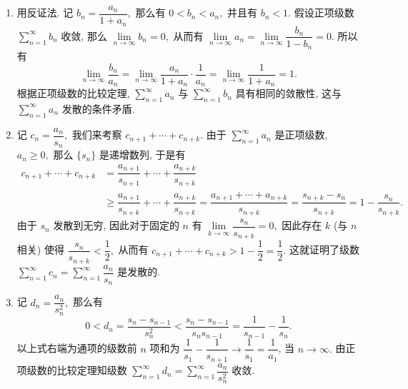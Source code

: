 \begin{solution}
  \begin{enumerate}
    \item 用反证法. 记 $b_n = \dfrac{a_n}{1 + a_n},$ 那么有 $0 < b_n < a_n,$ 并且有 $b_n < 1.$ 假设正项级数 $\sum\limits_{n=1}^{\infty} b_n$ 收敛, 那么 $\lim\limits_{n \to \infty} b_n = 0,$ 从而有 $\lim\limits_{n \to \infty} a_n = \lim\limits_{n \to \infty} \dfrac{b_n}{1 - b_n} = 0.$ 所以有
    $$\lim\limits_{n \to \infty} \dfrac{b_n}{a_n} = \lim\limits_{n \to \infty} \dfrac{a_n}{1 + a_n} \cdot \dfrac{1}{a_n} = \lim\limits_{n \to \infty} \dfrac{1}{1 + a_n} = 1.$$
    根据正项级数的比较定理, $\sum\limits_{n=1}^{\infty} a_n$ 与 $\sum\limits_{n=1}^{\infty} b_n$ 具有相同的敛散性, 这与 $\sum\limits_{n=1}^{\infty} a_n$ 发散的条件矛盾.
    \item 记 $c_n = \dfrac{a_n}{s_n},$ 我们来考察 $c_{n + 1} + \cdots + c_{n + k}.$ 由于 $\sum\limits_{n=1}^{\infty} a_n$ 是正项级数, $a_n \geqslant 0,$ 那么 $\{s_n\}$ 是递增数列, 于是有
    \begin{align*}
      c_{n + 1} + \cdots + c_{n + k} & = \dfrac{a_{n + 1}}{s_{n + 1}} + \cdots + \dfrac{a_{n + k}}{s_{n + k}} \\
      & \geqslant \dfrac{a_{n + 1}}{s_{n + k}} + \cdots + \dfrac{a_{n + k}}{s_{n + k}}= \dfrac{a_{n + 1} + \cdots + a_{n + k}}{s_{n + k}} = \dfrac{s_{n + k} - s_{n}}{s_{n + k}} = 1 - \dfrac{s_{n}}{s_{n + k}}.
    \end{align*}
    由于 $s_n$ 发散到无穷, 因此对于固定的 $n$ 有 $\lim\limits_{k \to \infty} \dfrac{s_{n}}{s_{n + k}} = 0,$ 因此存在 $k$ (与 $n$ 相关) 使得 $\dfrac{s_{n}}{s_{n + k}} < \dfrac{1}{2},$ 从而有 $c_{n + 1} + \cdots + c_{n + k} > 1 - \dfrac{1}{2} = \dfrac{1}{2}.$ 这就证明了级数 $\sum\limits_{n=1}^{\infty} c_n = \sum\limits_{n=1}^{\infty} \dfrac{a_n}{s_n}$ 是发散的.
    \item 记 $d_n = \dfrac{a_n}{s_n^2},$ 那么有
    $$0 < d_n = \dfrac{s_n - s_{n - 1}}{s_n^2} < \dfrac{s_n - s_{n - 1}}{s_n s_{n - 1}} = \dfrac{1}{s_{n - 1}} - \dfrac{1}{s_n}.$$
    以上式右端为通项的级数前 $n$ 项和为 $\dfrac{1}{s_1} - \dfrac{1}{s_{n + 1}} \to \dfrac{1}{s_1} = \dfrac{1}{a_1}$, 当 $n \to \infty.$ 由正项级数的比较定理知级数 $\sum\limits_{n=1}^{\infty} d_n = \sum\limits_{n=1}^{\infty} \dfrac{a_n}{s_n^2}$ 收敛.
  \end{enumerate}
\end{solution}


